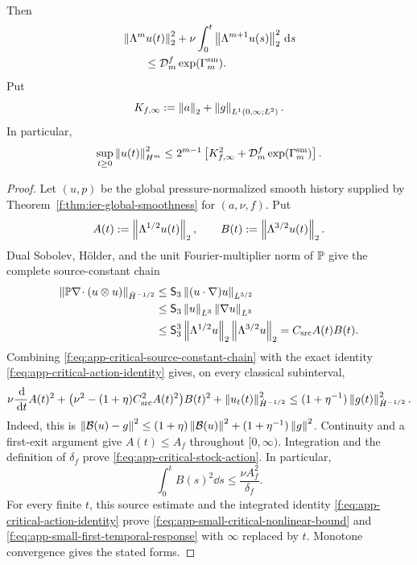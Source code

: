 \begin{theorem}
\begin{align}
 \label{f:eq:app-small-higher-force-data}
\end{align}
Then
\begin{align}
 &\left\lVert \Lambda^mu(t)\right\rVert_2^2
 +\nu\int_0^t\left\lVert \Lambda^{m+1}u(s)\right\rVert_2^2\,\mathrm d s
 \notag\\
 &\qquad\le
 \mathcal D_m^f\exp(\Gamma_m^{\rm sm}).
 \label{f:eq:app-small-data-finite-order}
\end{align}
Put
\[
 K_{f,\infty}:=\left\lVert a\right\rVert_2+\left\lVert g\right\rVert_{L^1(0,\infty;L^2)}.
\]
In particular,
\begin{equation}
 \sup_{t\ge0}\left\lVert u(t)\right\rVert_{H^m}^2
 \le
 2^{m-1}\left[
 K_{f,\infty}^2+
 \mathcal D_m^f\exp(\Gamma_m^{\rm sm})
 \right].
 \label{f:eq:app-small-data-Hm}
\end{equation}
\end{theorem}

\begin{proof}
Let \((u,p)\) be the global pressure-normalized smooth history supplied by
Theorem~\ref{f:thm:ier-global-smoothness} for \((a,\nu,f)\).  Put
\[
 A(t):=\left\lVert \Lambda^{1/2}u(t)\right\rVert_2,
 \qquad
 B(t):=\left\lVert \Lambda^{3/2}u(t)\right\rVert_2.
\]
 Dual Sobolev, H\"older, and the unit Fourier-multiplier norm of \(\mathbb P\)
give the complete source-constant chain
\begin{align}
 \left\lVert \mathbb P\nabla\!\cdot(u\otimes u)\right\rVert_{\dot H^{-1/2}}
 &\le \mathsf S_3\left\lVert (u\cdot\nabla)u\right\rVert_{L^{3/2}}
 \notag\\
 &\le \mathsf S_3\left\lVert u\right\rVert_{L^3}\left\lVert \nabla u\right\rVert_{L^3}
 \notag\\
 &\le \mathsf S_3^3
      \left\lVert \Lambda^{1/2}u\right\rVert_2
      \left\lVert \Lambda^{3/2}u\right\rVert_2
 =C_{\rm src}A(t)B(t).
 \label{f:eq:app-critical-source-constant-chain}
\end{align}
Combining \eqref{f:eq:app-critical-source-constant-chain} with the exact
identity \eqref{f:eq:app-critical-action-identity} gives, on every classical
subinterval,
\[
 \nu\frac{\,\mathrm d}{\,\mathrm d t}A(t)^2
 +\bigl(\nu^2-(1+\eta)C_{\rm src}^2A(t)^2\bigr)B(t)^2
 +\left\lVert u_t(t)\right\rVert_{\dot H^{-1/2}}^2
 \le(1+\eta^{-1})\left\lVert g(t)\right\rVert_{\dot H^{-1/2}}^2.
\]
Indeed, this is
\(\left\lVert \mathcal B(u)-g\right\rVert^2\le
(1+\eta)\left\lVert \mathcal B(u)\right\rVert^2
+(1+\eta^{-1})\left\lVert g\right\rVert^2\).
Continuity and a first-exit argument give \(A(t)\le A_f\) throughout
\([0,\infty)\).  Integration and the definition of \(\delta_f\) prove
\eqref{f:eq:app-critical-stock-action}.  In particular,
\[
 \int_0^tB(s)^2\dd s\le\frac{\nu A_f^2}{\delta_f}.
\]
For every finite \(t\), this source estimate and the integrated identity
\eqref{f:eq:app-critical-action-identity} prove
\eqref{f:eq:app-small-critical-nonlinear-bound} and
\eqref{f:eq:app-small-first-temporal-response} with \(\infty\) replaced by
\(t\).  Monotone convergence gives the stated forms.


\end{proof}
